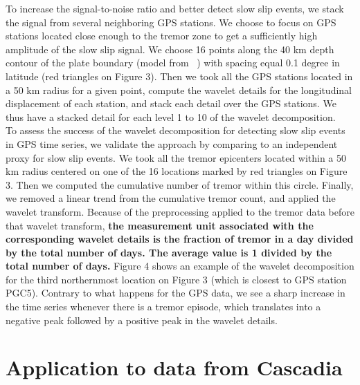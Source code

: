 \documentclass{article}
\begin{document}
To increase the signal-to-noise ratio and better detect slow slip events, we stack the signal from several neighboring GPS stations. We choose to focus on GPS stations located close enough to the tremor zone to get a sufficiently high amplitude of the slow slip signal. We choose 16 points along the 40 km depth contour of the plate boundary (model from ~\citet{PRE_2003}) with spacing equal 0.1 degree in latitude (red triangles on Figure 3). Then we took all the GPS stations located in a 50 km radius for a given point, compute the wavelet details for the longitudinal displacement of each station, and stack each detail over the GPS stations. We thus have a stacked detail for each level 1 to 10 of the wavelet decomposition. \\

To assess the success of the wavelet decomposition for detecting slow slip events in GPS time series, we validate the approach by comparing to an independent proxy for slow slip events. We took all the tremor epicenters located within a 50 km radius centered on one of the 16 locations marked by red triangles on Figure 3. Then we computed the cumulative number of tremor within this circle. Finally, we removed a linear trend from the cumulative tremor count, and applied the wavelet transform. Because of the preprocessing applied to the tremor data before that wavelet transform, \textbf{the measurement unit associated with the corresponding wavelet details is the fraction of tremor in a day divided by the total number of days. The average value is 1 divided by the total number of days.} Figure 4 shows an example of the wavelet decomposition for the third northernmost location on Figure 3 (which is closest to GPS station PGC5). Contrary to what happens for the GPS data, we see a sharp increase in the time series whenever there is a tremor episode, which translates into a negative peak followed by a positive peak in the wavelet details.

\section{Application to data from Cascadia}
\end{document}
